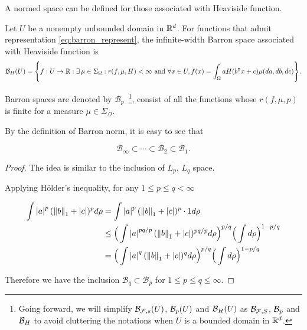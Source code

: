 A normed space can be defined for those associated with Heaviside function.

\begin{definition}
    \label{def:heaviside_space}
    Let $U$ be a nonempty unbounded domain in $\mathbb{R}^d$. For functions that admit
    representation \eqref{eq:barron_represent}, the infinite-width Barron space
    associated with Heaviside function is
    \begin{equation}
        \label{def:heaviside_space}
        \mathcal{B}_H(U) = \Bigg\{
            f: U \to \mathbb{R} : \exists\, \mu \in \Sigma_{\Omega}:
            r(f, \mu, H) < \infty \textnormal{ and }
            \forall x \in U, f(x) = \int_{\Omega} a H(b{}^{\intercal} x + c) \mu(da, db, dc)
        \Bigg\}.
    \end{equation}
\end{definition}

Barron spaces are denoted by $\mathcal{B}_p$~\footnote{
    Going forward, we will simplify $\mathcal{B}_{\mathcal{F}, s}(U)$, $\mathcal{B}_p(U)$ 
    and $\mathcal{B}_H(U)$ as $\mathcal{B}_{\mathcal{F}, S}$, $\mathcal{B}_p$ and 
    $\mathcal{B}_H$ to avoid cluttering the notations when $U$ is a bounded domain
    in $\mathbb{R}^d$.
}, consist of all the functions whose $r(f, \mu, p)$ is finite for a measure 
$\mu \in \Sigma_{\Omega}$.

\begin{proposition}
    By the definition of Barron norm, it is easy to see that

    \begin{equation}
        \mathcal{B}_{\infty} \subset \cdots \subset \mathcal{B}_{2} 
        \subset \mathcal{B}_1.
    \end{equation}
\end{proposition}



\begin{proof}

The idea is similar to the inclusion of $L_p$, $L_q$ space.

Applying Hölder's inequality, for any $1 \leq p \leq q < \infty$

\begin{align*}
    \int \left| a \right|^p (\left\| b \right\|_1 + \left| c \right|)^p d\rho
     & = \int \left| a \right|^p (\left\| b \right\|_1 + \left| c \right|)^p \cdot 1 d\rho                                                    \\
     & \leq \Big(\int \left| a \right|^{pq/p} (\left\| b \right\|_1 + \left| c \right|)^{pq/p} d\rho \Big)^{p/q} \Big(\int d\rho\Big)^{1-p/q} \\
     & = \Big(\int \left| a \right|^q (\left\| b \right\|_1 + \left| c \right|)^q d\rho \Big)^{p/q} \Big(\int d\rho\Big)^{1-p/q}
\end{align*}

Therefore we have the inclusion $\mathcal{B}_{q} \subset \mathcal{B}_p$ for $1
    \leq p \leq q \leq \infty$.
\end{proof}

